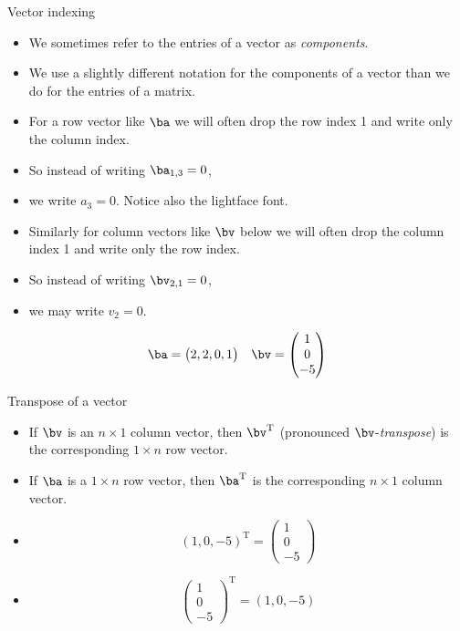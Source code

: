 \documentclass{beamer}
\begin{document}

\begin{frame}{Vector indexing}

\begin{itemize}
\item We sometimes refer to the entries of a vector as \emph{components}.
\item We use a slightly different notation for the components of a vector
than we do for the entries of a matrix.
\item For a row vector like $\ba$ we will often drop the row
index 1 and write only the column index.
\item So instead of writing $\ba_{1,3} = 0$,
\item we write $a_3 = 0$. Notice also the lightface font.
\item Similarly for column vectors like $\bv$ below we will often
drop the column index 1 and write only the row index.
\item So instead of writing $\bv_{2,1} = 0$,
\item we may write $v_2 = 0$.
\end{itemize}

$$
\begin{matrix}
\ba =
\begin{pmatrix}
2, 2, 0, 1
\end{pmatrix}

&

\bv =
\begin{pmatrix}
1 \\
0 \\
-5
\end{pmatrix}
\end{matrix}
$$

\end{frame}


\begin{frame}{Transpose of a vector}

\begin{itemize}
\item If $\bv$ is an $n\times 1$ column vector, then $\bv^{\text{T}}$
(pronounced $\bv$-\emph{transpose}) is the corresponding $1\times n$ row vector.
\item If $\ba$ is a $1\times n$ row vector, then $\ba^{\text{T}}$ is the
corresponding $n\times 1$ column vector.
\item $$(1, 0, -5)^{\text{T}} = \begin{pmatrix} 1 \\ 0 \\ -5 \end{pmatrix}$$
\item $$\begin{pmatrix} 1 \\ 0 \\ -5 \end{pmatrix}^{\text{T}} =  (1, 0, -5)$$
\end{itemize}
\end{frame}
\end{document}

